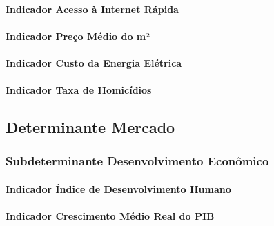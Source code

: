 \documentclass[
  12,
  dvipsnames]{article}
\begin{document}
\hypertarget{indicador-acesso-uxe0-internet-ruxe1pida}{%
\paragraph{Indicador Acesso à Internet
Rápida}\label{indicador-acesso-uxe0-internet-ruxe1pida}}

\hypertarget{indicador-preuxe7o-muxe9dio-do-muxb2}{%
\paragraph{Indicador Preço Médio do
m²}\label{indicador-preuxe7o-muxe9dio-do-muxb2}}

\hypertarget{indicador-custo-da-energia-eluxe9trica}{%
\paragraph{Indicador Custo da Energia
Elétrica}\label{indicador-custo-da-energia-eluxe9trica}}

\hypertarget{indicador-taxa-de-homicuxeddios}{%
\paragraph{Indicador Taxa de
Homicídios}\label{indicador-taxa-de-homicuxeddios}}

\hypertarget{determinante-mercado}{%
\subsection{Determinante Mercado}\label{determinante-mercado}}

\hypertarget{subdeterminante-desenvolvimento-econuxf4mico}{%
\subsubsection{Subdeterminante Desenvolvimento
Econômico}\label{subdeterminante-desenvolvimento-econuxf4mico}}

\hypertarget{indicador-uxedndice-de-desenvolvimento-humano}{%
\paragraph{Indicador Índice de Desenvolvimento
Humano}\label{indicador-uxedndice-de-desenvolvimento-humano}}

\hypertarget{indicador-crescimento-muxe9dio-real-do-pib}{%
\paragraph{Indicador Crescimento Médio Real do
PIB}\label{indicador-crescimento-muxe9dio-real-do-pib}}
\end{document}
